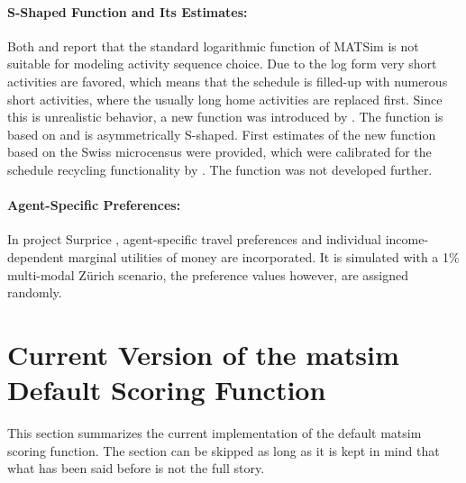 \paragraph{S-Shaped Function and Its Estimates:}
Both \citet[][p.127f]{Feil_PhDThesis_2010} and \citet[][p.32]{MATSim_Userguide_2014} report that the standard logarithmic function of MATSim is not suitable for modeling activity sequence choice. Due to the log form very short activities are favored, which means that the schedule is filled-up with numerous short activities, where the usually long home activities are replaced first. Since this is unrealistic behavior, a new function was introduced by \citet[][p.129ff]{Feil_PhDThesis_2010}. The function is based on \citet[][]{Joh_PhDThesis_2004} and is asymmetrically S-shaped. First estimates of the new function based on the Swiss microcensus were provided, which were calibrated for the schedule recycling functionality by \citet[][p.152f]{Feil_PhDThesis_2010}. The function was not developed further.

\paragraph{Agent-Specific Preferences:}
In project Surprice \citet[][]{HorniEtAl_TechRep_IVT_2012_a, HorniAxhausen_TechRep_IVT_2014}, agent-specific travel preferences and individual income-dependent marginal utilities of money are incorporated. It is simulated with a 1\% multi-modal Zürich scenario, the preference values however, are assigned randomly. 

\section{Current Version of the \acrshort{matsim} Default Scoring Function}
\label{sec:scoring-current}

This section summarizes the current implementation of the default \acrshort{matsim} scoring function.  The section can be skipped as long as it is kept in mind that what has been said before is not the full story.


